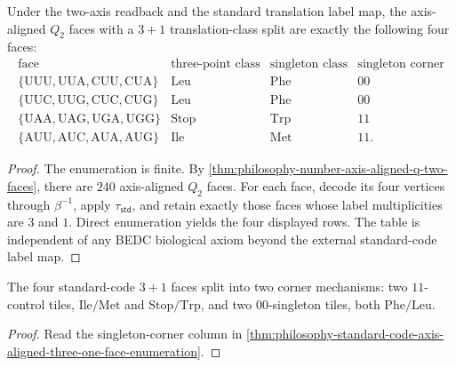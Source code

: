 \begin{theorem}
\label{thm:philosophy-standard-code-axis-aligned-three-one-face-enumeration}
Under the two-axis readback and the standard translation label map, the
axis-aligned $Q_{2}$ faces with a $3+1$ translation-class split are
exactly the following four faces:
$$
\begin{array}{c|c|c|c}
  \text{face} & \text{three-point class} & \text{singleton class}
    & \text{singleton corner}\\
\hline
  \{\mathrm{UUU},\mathrm{UUA},\mathrm{CUU},\mathrm{CUA}\}
    & \mathrm{Leu} & \mathrm{Phe} & 00\\
  \{\mathrm{UUC},\mathrm{UUG},\mathrm{CUC},\mathrm{CUG}\}
    & \mathrm{Leu} & \mathrm{Phe} & 00\\
  \{\mathrm{UAA},\mathrm{UAG},\mathrm{UGA},\mathrm{UGG}\}
    & \mathrm{Stop} & \mathrm{Trp} & 11\\
  \{\mathrm{AUU},\mathrm{AUC},\mathrm{AUA},\mathrm{AUG}\}
    & \mathrm{Ile} & \mathrm{Met} & 11.
\end{array}
$$
\end{theorem}
\begin{proof}
The enumeration is finite. By
\autoref{thm:philosophy-number-axis-aligned-q-two-faces}, there are
$240$ axis-aligned $Q_{2}$ faces. For each face, decode its four vertices
through $\beta^{-1}$, apply $\tau_{\mathsf{std}}$, and retain exactly
those faces whose label multiplicities are $3$ and $1$. Direct
enumeration yields the four displayed rows. The table is independent of
any BEDC biological axiom beyond the external standard-code label map.
\end{proof}

\begin{corollary}
\label{cor:philosophy-two-corner-mechanisms}
The four standard-code $3+1$ faces split into two corner mechanisms:
two $11$-control tiles, $\mathrm{Ile}/\mathrm{Met}$ and
$\mathrm{Stop}/\mathrm{Trp}$, and two $00$-singleton tiles, both
$\mathrm{Phe}/\mathrm{Leu}$.
\end{corollary}
\begin{proof}
Read the singleton-corner column in
\autoref{thm:philosophy-standard-code-axis-aligned-three-one-face-enumeration}.
\end{proof}

